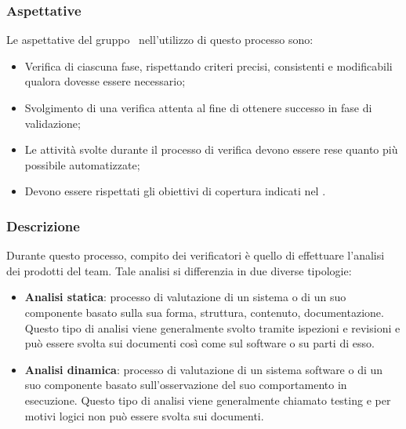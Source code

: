     \subsubsection{Aspettative}
    Le aspettative del gruppo \groupName\ nell’utilizzo di questo processo sono:
    \begin{itemize}
        \item Verifica di ciascuna fase, rispettando criteri precisi, consistenti e modificabili qualora dovesse essere necessario;
        \item Svolgimento di una verifica attenta al fine di ottenere successo in fase di validazione;
        \item Le attività svolte durante il processo di verifica devono essere rese quanto più possibile automatizzate;
        \item Devono essere rispettati gli obiettivi di copertura indicati nel \docNamePdQLow.
    \end{itemize}

    \subsubsection{Descrizione}
    Durante questo processo, compito dei verificatori è quello di effettuare l'analisi dei prodotti del team. Tale analisi si differenzia in due diverse tipologie:
    \begin{itemize}
        \item \textbf{Analisi statica}: processo di valutazione di un sistema o di un suo componente basato sulla sua forma, struttura, contenuto, documentazione. Questo tipo di analisi viene generalmente svolto tramite ispezioni e revisioni e può essere svolta sui documenti così come sul software o su parti di esso.
        \item \textbf{Analisi dinamica}: processo di valutazione di un sistema software o di un suo componente basato sull'osservazione del suo comportamento in esecuzione. Questo tipo di analisi viene generalmente chiamato testing e per motivi logici non può essere svolta sui documenti.
    \end{itemize}

